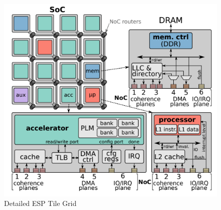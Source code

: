 
\begin{figure}[t]
  \centering
  \captionsetup{justification=centering, format=hang}
  \includegraphics[width=1\columnwidth]{fig/noccache.png}
  \caption{Detailed ESP Tile Grid~\cite{giri18}}
  \label{fig:esp_tile}
  \end{figure}

